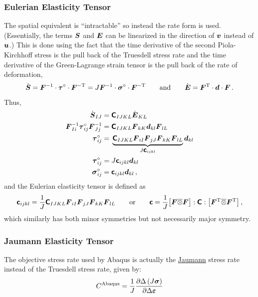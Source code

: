 \documentclass[10pt,letterpaper,oneside]{report}
\newcommand{\ten}[1]{\mbox{\boldmath $#1$}{}}
\newcommand{\tenf}[1]{\mbox{{\sffamily{\bfseries {#1}}}}}
\newcommand{\scas}[1]{\mbox{{\scriptsize{${\rm{#1}}$}}}{}}
\begin{document}
\begin{itemize}
\subsubsection{Eulerian Elasticity Tensor}
The spatial equivalent is ``intractable'' so instead the rate form is used.  (Essentially, the terms $\ten{S}$ and $\ten{E}$ can be linearized in the direction of $\ten{v}$ instead of $\ten{u}$.)  This is done using the fact that the time derivative of the second Piola-Kirchhoff stress is the pull back of the Truesdell stress rate and the time derivative of the Green-Lagrange strain tensor is the pull back of the rate of deformation,
\begin{equation}
\dot{\ten{S}}  
= \ten{F}^{-1} \cdot \ten{ \tau }^{\circ} \cdot \ten{F}^{-\scas{T}} 
= J \ten{F}^{-1} \cdot \ten{ \sigma }^{\circ} \cdot \ten{F}^{-\scas{T}}
\qquad \mbox{and} \qquad 
\dot{\ten{E}} = \ten{F}^{\scas{T}} \cdot \ten{d} \cdot \ten{F} \, .
\end{equation}
Thus, 
\begin{align}
\dot{\ten{S}}_{IJ} ={}& \tenf{C}_{IJKL} \dot{\ten{E}}_{KL}
\\
\ten{F}^{-1}_{Ii} \ten{ \tau }^{\circ}_{ij} \ten{F}^{-1}_{Jj} ={}& \tenf{C}_{IJKL} \ten{F}_{kK} \ten{d}_{kl} \ten{F}_{lL}
\notag \\
\ten{ \tau }^{\circ}_{ij} ={}& \underbrace{ \tenf{C}_{IJKL} \ten{F}_{iI} \ten{F}_{jJ} \ten{F}_{kK} \ten{F}_{lL} }_{J \tenf{c}_{ijkl}}  \ten{d}_{kl}
\notag \\
\ten{ \tau }^{\circ}_{ij} ={}& J \tenf{c}_{ijkl} \ten{d}_{kl} 
\\
\ten{ \sigma }^{\circ}_{ij} ={}& \tenf{c}_{ijkl} \ten{d}_{kl} \, ,
\end{align}
and the Eulerian elasticity tensor is defined as
\begin{equation}
\tenf{c}_{ijkl} = \frac{1}{J} \tenf{C}_{IJKL} \ten{F}_{iI} \ten{F}_{jJ} \ten{F}_{kK} \ten{F}_{lL} 
\qquad \mbox{or} \qquad
\tenf{c}  = \frac{1}{J} \big[ \ten{F} \overline{\otimes} \ten{F} \big] : \tenf{C} : \big[ \ten{F}^{\scas{T}} \overline{\otimes} \ten{F}^{\scas{T}} \big] \, , 
\end{equation}
which similarly has both minor symmetries but not necessarily major symmetry.  


\subsubsection{Jaumann Elasticity Tensor}
The objective stress rate used by Abaqus is actually the \hyperlink{jaumann}{Jaumann} stress rate instead of the Truesdell stress rate, given by: 
\begin{equation}
{C}^{\scas{Abaqus}} = \frac{1}{J} \frac{\partial \Delta \left( J \ten{\sigma} \right)}{\partial \Delta \ten{\varepsilon}}
\end{equation}


\end{itemize}
\end{document}
